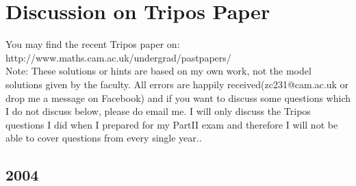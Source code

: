 \section{Discussion on Tripos Paper}
You may find the recent Tripos paper on:\\
http://www.maths.cam.ac.uk/undergrad/pastpapers/ \\
Note: These solutions or hints are based on my own work, not the model solutions given by the faculty. All errors are happily received(zc231@cam.ac.uk or drop me a message on Facebook) and if you want to discuss some questions which I do not discuss below, please do email me. I will only discuss the Tripos questions I did when I prepared for my PartII exam and therefore I will not be able to cover questions from every single year..
\subsection{2004}
